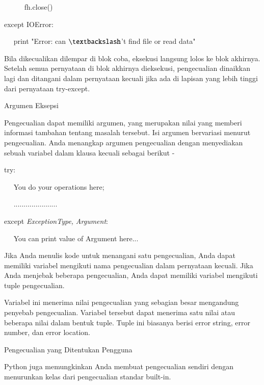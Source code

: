 \documentclass[a4paper,12pt]{report}
\begin{document}
\noindent 
~~~~~ fh.close() \par
\noindent 
except IOError: \par
\noindent 
~~ print "Error: can $  \textbackslash  $'t find file or read data" \par
\vspace{12pt}
\vspace{16pt}
\noindent 
Bila dikecualikan dilempar di blok coba, eksekusi langsung lolos ke blok akhirnya. Setelah semua pernyataan di blok akhirnya dieksekusi, pengecualian dinaikkan lagi dan ditangani dalam pernyataan kecuali jika ada di lapisan yang lebih tinggi dari pernyataan try-except. \par
\noindent 
Argumen Eksepsi \par
\vspace{12pt}
\noindent 
Pengecualian dapat memiliki argumen, yang merupakan nilai yang memberi informasi tambahan tentang masalah tersebut. Isi argumen bervariasi menurut pengecualian. Anda menangkap argumen pengecualian dengan menyediakan sebuah variabel dalam klausa kecuali sebagai berikut - \par
\vspace{12pt}
\noindent 
try: \par
\noindent 
~~ You do your operations here; \par
\noindent 
~~ ...................... \par
\noindent 
except \textit{ExceptionType}\textit{,}\textit{ }\textit{Argument}: \par
\noindent 
~~ You can print value of Argument here... \par
\vspace{12pt}
\noindent 
Jika Anda menulis kode untuk menangani satu pengecualian, Anda dapat memiliki variabel mengikuti nama pengecualian dalam pernyataan kecuali. Jika Anda menjebak beberapa pengecualian, Anda dapat memiliki variabel mengikuti tuple pengecualian. \par
\vspace{12pt}
\noindent 
Variabel ini menerima nilai pengecualian yang sebagian besar mengandung penyebab pengecualian. Variabel tersebut dapat menerima satu nilai atau beberapa nilai dalam bentuk tuple. Tuple ini biasanya berisi error string, error number, dan error location. \par
\vspace{12pt}
\noindent 
Pengecualian yang Ditentukan Pengguna \par
\vspace{12pt}
\noindent 
Python juga memungkinkan Anda membuat pengecualian sendiri dengan menurunkan kelas dari pengecualian standar built-in. \par
\end{document}
